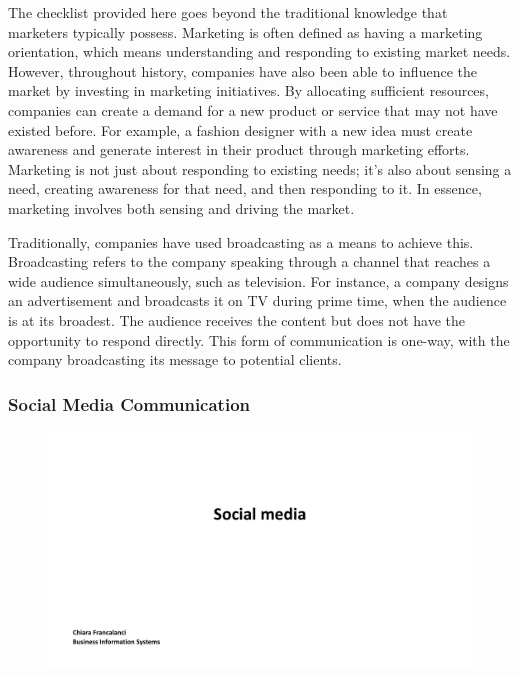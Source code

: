 The checklist provided here goes beyond the traditional knowledge that
marketers typically possess. Marketing is often defined as having a
marketing orientation, which means understanding and responding to
existing market needs. However, throughout history, companies have also
been able to influence the market by investing in marketing initiatives.
By allocating sufficient resources, companies can create a demand for a
new product or service that may not have existed before. For example, a
fashion designer with a new idea must create awareness and generate
interest in their product through marketing efforts. Marketing is not
just about responding to existing needs; it's also about sensing a need,
creating awareness for that need, and then responding to it. In essence,
marketing involves both sensing and driving the market.

Traditionally, companies have used broadcasting as a means to achieve
this. Broadcasting refers to the company speaking through a channel that
reaches a wide audience simultaneously, such as television. For
instance, a company designs an advertisement and broadcasts it on TV
during prime time, when the audience is at its broadest. The audience
receives the content but does not have the opportunity to respond
directly. This form of communication is one-way, with the company
broadcasting its message to potential clients.

\subsubsection{Social Media
  Communication}\label{social-media-communication}

\begin{figure}[!h]
  \centering
  \includegraphics[page=18, trim = 1.5cm 4.5cm 3cm 0.5cm, clip, width=\imagewidth]{images/04 - Social_Media.pdf}
\end{figure}

